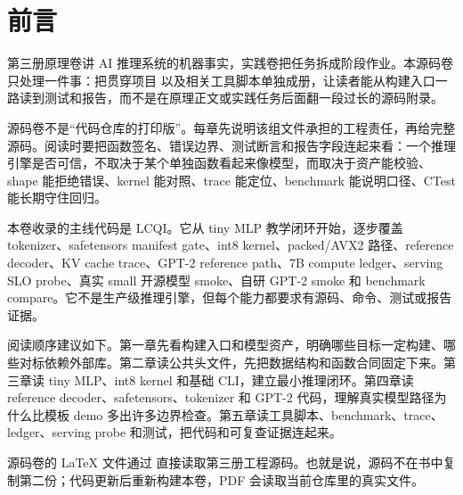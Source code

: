 \chapter*{前言}

第三册原理卷讲 AI 推理系统的机器事实，实践卷把任务拆成阶段作业。本源码卷只处理一件事：把贯穿项目  以及相关工具脚本单独成册，让读者能从构建入口一路读到测试和报告，而不是在原理正文或实践任务后面翻一段过长的源码附录。

\begin{keyidea}
源码卷不是“代码仓库的打印版”。每章先说明该组文件承担的工程责任，再给完整源码。阅读时要把函数签名、错误边界、测试断言和报告字段连起来看：一个推理引擎是否可信，不取决于某个单独函数看起来像模型，而取决于资产能校验、shape 能拒绝错误、kernel 能对照、trace 能定位、benchmark 能说明口径、CTest 能长期守住回归。
\end{keyidea}

本卷收录的主线代码是 LCQI。它从 tiny MLP 教学闭环开始，逐步覆盖 tokenizer、safetensors manifest gate、int8 kernel、packed/AVX2 路径、reference decoder、KV cache trace、GPT-2 reference path、7B compute ledger、serving SLO probe、真实 small 开源模型 smoke、自研 GPT-2 smoke 和 benchmark compare。它不是生产级推理引擎，但每个能力都要求有源码、命令、测试或报告证据。

阅读顺序建议如下。第一章先看构建入口和模型资产，明确哪些目标一定构建、哪些对标依赖外部库。第二章读公共头文件，先把数据结构和函数合同固定下来。第三章读 tiny MLP、int8 kernel 和基础 CLI，建立最小推理闭环。第四章读 reference decoder、safetensors、tokenizer 和 GPT-2 代码，理解真实模型路径为什么比模板 demo 多出许多边界检查。第五章读工具脚本、benchmark、trace、ledger、serving probe 和测试，把代码和可复查证据连起来。

源码卷的 LaTeX 文件通过  直接读取第三册工程源码。也就是说，源码不在书中复制第二份；代码更新后重新构建本卷，PDF 会读取当前仓库里的真实文件。

